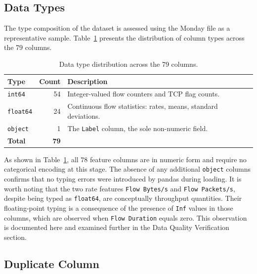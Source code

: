 \documentclass[12pt,a4paper]{article}
\begin{document}
\subsection{Data Types}

The type composition of the dataset is assessed using the Monday file as a
representative sample. Table~\ref{tab:dtypes} presents the distribution of
column types across the 79 columns.

\begin{table}[H]
    \centering
    \caption{Data type distribution across the 79 columns.}
    \label{tab:dtypes}
    \begin{tabular}{|l|r|l|}
        \hline
        \textbf{Type}    & \textbf{Count} & \textbf{Description}                                           \\
        \hline
        \texttt{int64}   & 54             & Integer-valued flow counters and TCP flag counts.              \\
        \hline
        \texttt{float64} & 24             & Continuous flow statistics: rates, means, standard deviations. \\
        \hline
        \texttt{object}  & 1              & The \texttt{Label} column, the sole non-numeric field.         \\
        \hline
        \textbf{Total}   & \textbf{79}    &                                                                \\
        \hline
    \end{tabular}
\end{table}

As shown in Table~\ref{tab:dtypes}, all 78 feature columns are in numeric form
and require no categorical encoding at this stage. The absence of any additional
\texttt{object} columns confirms that no typing errors were introduced by pandas
during loading. It is worth noting that the two rate features \texttt{Flow Bytes/s}
and \texttt{Flow Packets/s}, despite being typed as \texttt{float64}, are
conceptually throughput quantities. Their floating-point typing is a consequence
of the presence of \texttt{Inf} values in those columns, which are observed when
\texttt{Flow Duration} equals zero. This observation is documented here and
examined further in the Data Quality Verification section.

\subsection{Duplicate Column}
\end{document}

